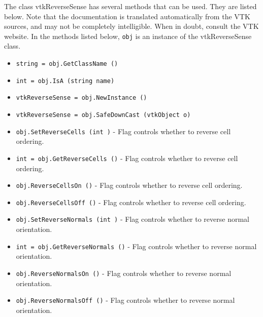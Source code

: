 The class vtkReverseSense has several methods that can be used.
  They are listed below.
Note that the documentation is translated automatically from the VTK sources,
and may not be completely intelligible.  When in doubt, consult the VTK website.
In the methods listed below, \verb|obj| is an instance of the vtkReverseSense class.
\begin{itemize}
\item  \verb|string = obj.GetClassName ()|

\item  \verb|int = obj.IsA (string name)|

\item  \verb|vtkReverseSense = obj.NewInstance ()|

\item  \verb|vtkReverseSense = obj.SafeDownCast (vtkObject o)|

\item  \verb|obj.SetReverseCells (int )| -  Flag controls whether to reverse cell ordering.

\item  \verb|int = obj.GetReverseCells ()| -  Flag controls whether to reverse cell ordering.

\item  \verb|obj.ReverseCellsOn ()| -  Flag controls whether to reverse cell ordering.

\item  \verb|obj.ReverseCellsOff ()| -  Flag controls whether to reverse cell ordering.

\item  \verb|obj.SetReverseNormals (int )| -  Flag controls whether to reverse normal orientation.

\item  \verb|int = obj.GetReverseNormals ()| -  Flag controls whether to reverse normal orientation.

\item  \verb|obj.ReverseNormalsOn ()| -  Flag controls whether to reverse normal orientation.

\item  \verb|obj.ReverseNormalsOff ()| -  Flag controls whether to reverse normal orientation.

\end{itemize}
